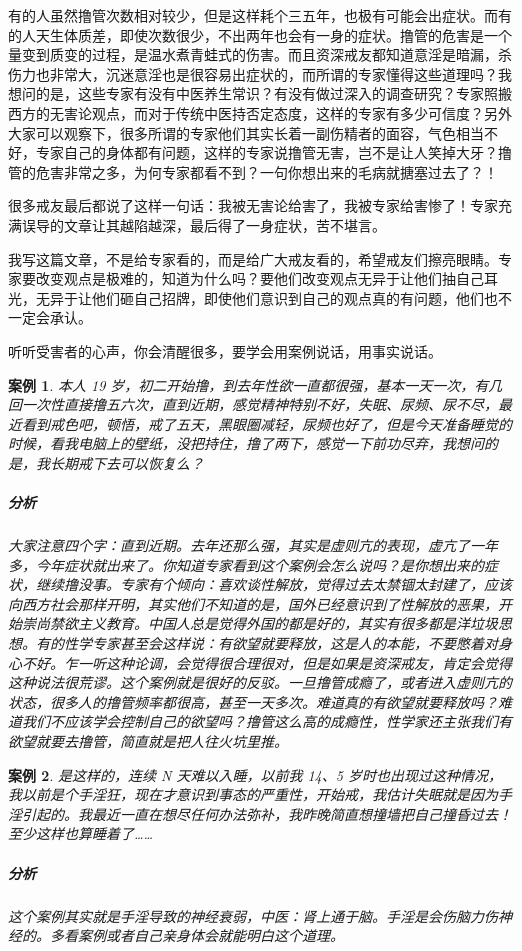 \documentclass{ctexart}
\newtheorem{case}{案例}
\begin{document}
有的人虽然撸管次数相对较少，但是这样耗个三五年，也极有可能会出症状。而有的人天生体质差，即使次数很少，不出两年也会有一身的症状。撸管的危害是一个量变到质变的过程，是温水煮青蛙式的伤害。而且资深戒友都知道意淫是暗漏，杀伤力也非常大，沉迷意淫也是很容易出症状的，而所谓的专家懂得这些道理吗？我想问的是，这些专家有没有中医养生常识？有没有做过深入的调查研究？专家照搬西方的无害论观点，而对于传统中医持否定态度，这样的专家有多少可信度？另外大家可以观察下，很多所谓的专家他们其实长着一副伤精者的面容，气色相当不好，专家自己的身体都有问题，这样的专家说撸管无害，岂不是让人笑掉大牙？撸管的危害非常之多，为何专家都看不到？一句你想出来的毛病就搪塞过去了？！

很多戒友最后都说了这样一句话：我被无害论给害了，我被专家给害惨了！专家充满误导的文章让其越陷越深，最后得了一身症状，苦不堪言。

我写这篇文章，不是给专家看的，而是给广大戒友看的，希望戒友们擦亮眼睛。专家要改变观点是极难的，知道为什么吗？要他们改变观点无异于让他们抽自己耳光，无异于让他们砸自己招牌，即使他们意识到自己的观点真的有问题，他们也不一定会承认。

听听受害者的心声，你会清醒很多，要学会用案例说话，用事实说话。

\begin{case}
    本人 19 岁，初二开始撸，到去年性欲一直都很强，基本一天一次，有几回一次性直接撸五六次，直到近期，感觉精神特别不好，失眠、尿频、尿不尽，最近看到戒色吧，顿悟，戒了五天，黑眼圈减轻，尿频也好了，但是今天准备睡觉的时候，看我电脑上的壁纸，没把持住，撸了两下，感觉一下前功尽弃，我想问的是，我长期戒下去可以恢复么？
    \subparagraph{分析} 大家注意四个字：直到近期。去年还那么强，其实是虚则亢的表现，虚亢了一年多，今年症状就出来了。你知道专家看到这个案例会怎么说吗？是你想出来的症状，继续撸没事。专家有个倾向：喜欢谈性解放，觉得过去太禁锢太封建了，应该向西方社会那样开明，其实他们不知道的是，国外已经意识到了性解放的恶果，开始崇尚禁欲主义教育。中国人总是觉得外国的都是好的，其实有很多都是洋垃圾思想。有的性学专家甚至会这样说：有欲望就要释放，这是人的本能，不要憋着对身心不好。乍一听这种论调，会觉得很合理很对，但是如果是资深戒友，肯定会觉得这种说法很荒谬。这个案例就是很好的反驳。一旦撸管成瘾了，或者进入虚则亢的状态，很多人的撸管频率都很高，甚至一天多次。难道真的有欲望就要释放吗？难道我们不应该学会控制自己的欲望吗？撸管这么高的成瘾性，性学家还主张我们有欲望就要去撸管，简直就是把人往火坑里推。
\end{case}

\begin{case}
    是这样的，连续 N 天难以入睡，以前我 14、5 岁时也出现过这种情况，我以前是个手淫狂，现在才意识到事态的严重性，开始戒，我估计失眠就是因为手淫引起的。我最近一直在想尽任何办法弥补，我昨晚简直想撞墙把自己撞昏过去！至少这样也算睡着了……
    \subparagraph{分析} 这个案例其实就是手淫导致的神经衰弱，中医：肾上通于脑。手淫是会伤脑力伤神经的。多看案例或者自己亲身体会就能明白这个道理。
\end{case}
\end{document}
